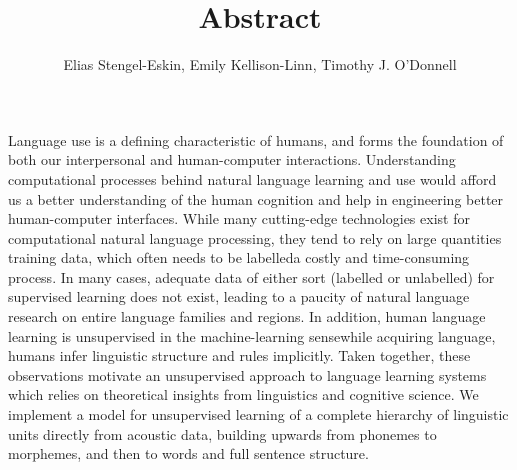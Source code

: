 \documentclass[12pt,letterpaper]{article}
\title{\vspace{-1.5cm} Abstract}
\author{Elias Stengel-Eskin, Emily Kellison-Linn, Timothy J. O'Donnell}
\newif\ifcomments
\newcommand{\cm}[1]{\textcolor{purple}{\ifcomments[COMMENT: #1]\else\fi}}
\begin{document}
\maketitle
Language use is a defining characteristic of humans, and forms the foundation of both our interpersonal and human-computer interactions.  Understanding computational processes behind natural language learning and use would afford us a better understanding of the human cognition and help in engineering better human-computer interfaces. While many cutting-edge technologies exist for computational natural language processing, they tend to rely on large quantities training data, which often needs to be labelled\textemdash a costly and time-consuming process.
In many cases, adequate data of either sort (labelled or unlabelled) for supervised learning does not exist, leading to a paucity of natural language research on entire language families and regions.
In addition, human language learning is unsupervised in the machine-learning sense\textemdash while acquiring language, humans infer linguistic structure and rules implicitly.
Taken together, these observations motivate an unsupervised approach to language learning systems which relies on theoretical insights from linguistics and cognitive science. We implement a model for unsupervised learning of a complete hierarchy of linguistic units directly from acoustic data, building upwards from phonemes to morphemes, and then to words and full sentence structure. \\
\end{document}
